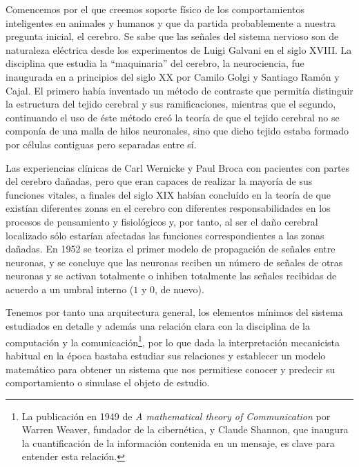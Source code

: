 \documentclass[12pt]{memoir}
\begin{document}
Comencemos por el que creemos soporte físico de los comportamientos inteligentes en animales y humanos y que da partida probablemente a nuestra pregunta inicial, el cerebro. Se sabe que las señales del sistema nervioso son de naturaleza eléctrica desde los experimentos de Luigi Galvani en el siglo XVIII. La disciplina que estudia la ``maquinaria'' del cerebro, la neurociencia, fue inaugurada en a principios del siglo XX por Camilo Golgi y Santiago Ramón y Cajal. El primero había inventado un método de contraste que permitía distinguir la estructura del tejido cerebral y sus ramificaciones, mientras que el segundo, continuando el uso de éste método creó la teoría de que el tejido cerebral no se componía de una malla de hilos neuronales, sino que dicho tejido estaba formado por células contiguas pero separadas entre sí. 

Las experiencias clínicas de Carl Wernicke y Paul Broca con pacientes con partes del cerebro dañadas, pero que eran capaces de realizar la mayoría de sus funciones vitales, a finales del siglo XIX habían concluído en la teoría de que existían diferentes zonas en el cerebro con diferentes responsabilidades en los procesos de pensamiento y fisiológicos y, por tanto, al ser el daño cerebral localizado sólo estarían afectadas las funciones correspondientes a las zonas dañadas. En 1952 se teoriza el primer modelo de propagación de señales entre neuronas, y se concluye que las neuronas reciben un número de señales de otras neuronas y se activan totalmente o inhiben totalmente las señales recibidas de acuerdo a un umbral interno ($1$ y $0$, de nuevo).

Tenemos por tanto una arquitectura general, los elementos mínimos del sistema estudiados en detalle y además una relación clara con la disciplina de la computación y la comunicación\footnote{La publicación en 1949 de \textit{A mathematical theory of Communication} por Warren Weaver, fundador de la cibernética, y Claude Shannon, que inaugura la cuantificación de la información contenida en un mensaje, es clave para entender esta relación.}, por lo que dada la interpretación mecanicista habitual en la época bastaba estudiar sus relaciones y establecer un modelo matemático para obtener un sistema que nos permitiese conocer y predecir su comportamiento o simulase el objeto de estudio.
\end{document}
